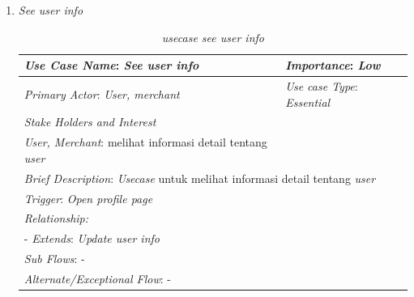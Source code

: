 \documentclass[a4paper]{article}
\begin{document}
\begin{enumerate}
\begin{enumerate}
        \newpage
        \item \textit{See user info}
        \begin{table}[h]
            \centering
            \begin{tabular}{|lll}
            \hline
            \multicolumn{1}{|l|}{\textit{Use Case Name}: \textit{See user info}}             & \multicolumn{2}{l|}{\textit{Importance}: \textit{Low}}   \\ \hline
            \multicolumn{1}{|l|}{\textit{Primary Actor}: \textit{User, merchant}}             & \multicolumn{2}{l|}{\textit{Use case Type}: \textit{Essential}} \\ \hline
            \multicolumn{1}{|l|}{\textit{Stake Holders and Interest}} &                               &                               \\ \cline{1-1}
            \multicolumn{1}{|l|}{\textit{User, Merchant}: melihat informasi detail tentang \textit{user}}                                                     &                               &                               \\ \hline
            \multicolumn{3}{|l|}{\textit{Brief Description}: \textit{Usecase} untuk melihat informasi detail tentang \textit{user}}                                                                         \\ \hline
            \multicolumn{3}{|l|}{\textit{Trigger}: \textit{Open profile page}}                                                                                   \\ \hline
            \multicolumn{3}{|l|}{\textit{Relationship:}}                                                                              \\ \hline
            \multicolumn{3}{|l|}{- \textit{Extends}: \textit{Update user info}}                                                                                                                     \\ \hline
            \multicolumn{3}{|l|}{\textit{Sub Flows}: -}                                                                                 \\ \hline
            \multicolumn{3}{|l|}{\textit{Alternate/Exceptional Flow}: -}                                                                \\ \hline
            \end{tabular}
            \caption{\textit{usecase see user info} }
        \end{table}



\end{enumerate}
\end{enumerate}
\end{document}
